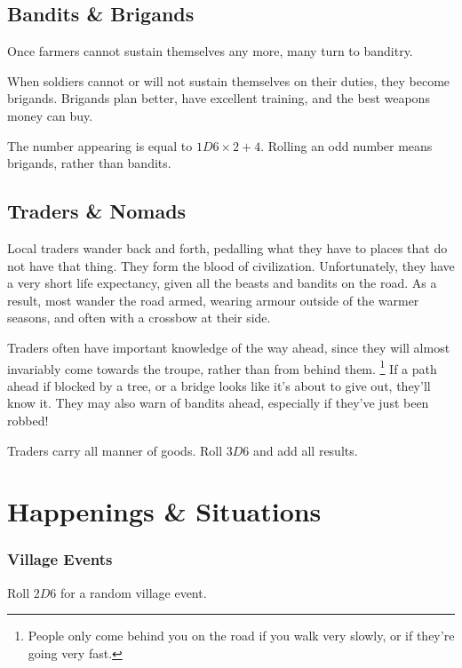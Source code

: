 \begin{multicols}{2}

\subsection{Bandits \& Brigands}

Once farmers cannot sustain themselves any more, many turn to banditry.

When soldiers cannot or will not sustain themselves on their duties, they become brigands.
Brigands plan better, have excellent training, and the best weapons money can buy.

The number appearing is equal to $1D6\times 2 + 4$.
Rolling an odd number means brigands, rather than bandits.


\encBandits

\subsection{Traders \& Nomads}

Local traders wander back and forth, pedalling what they have to places that do not have that thing.
They form the blood of civilization.
Unfortunately, they have a very short life expectancy, given all the beasts and bandits on the road.
As a result, most wander the road armed, wearing armour outside of the warmer seasons, and often with a crossbow at their side.

Traders often have important knowledge of the way ahead, since they will almost invariably come towards the troupe, rather than from behind them.%
\footnote{People only come behind you on the road if you walk very slowly, or if they're going very fast.}
If a path ahead if blocked by a tree, or a bridge looks like it's about to give out, they'll know it.
They may also warn of bandits ahead, especially if they've just been robbed!

Traders carry all manner of goods.
Roll $3D6$ and add all results.

\encTraders

\end{multicols}

\section{Happenings \& Situations}

\begin{multicols}{2}

\subsubsection{Village Events}

Roll $2D6$ for a random village event.

\encVillageEvent

\end{multicols}

